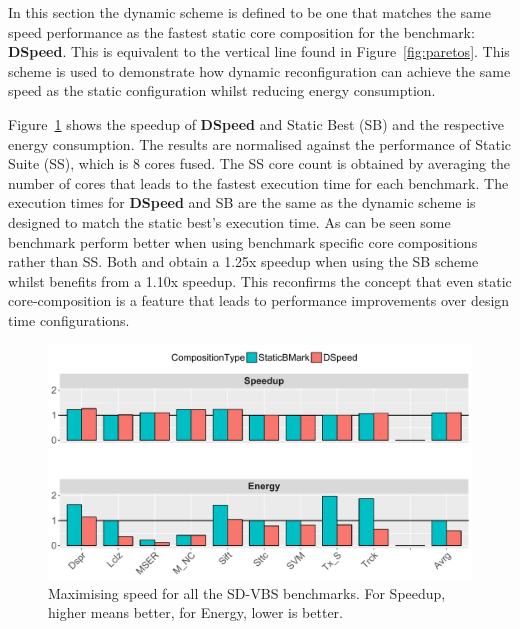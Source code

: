 In this section the dynamic scheme is defined to be one that matches the same speed performance as the fastest static core composition for the benchmark: \textbf{DSpeed}.
This is equivalent to the vertical line found in Figure~\ref{fig:paretos}.
This scheme is used to demonstrate how dynamic reconfiguration can achieve the same speed as the static configuration whilst reducing energy consumption.

Figure~\ref{fig:speedres} shows the speedup of \textbf{DSpeed} and Static Best (SB) and the respective energy consumption.
The results are normalised against the performance of Static Suite (SS), which is 8 cores fused.
The SS core count is obtained by averaging the number of cores that leads to the fastest execution time for each benchmark.
The execution times for \textbf{DSpeed} and SB are the same as the dynamic scheme is designed to match the static best's execution time.
As can be seen some benchmark perform better when using benchmark specific core compositions rather than SS.
Both  and  obtain a 1.25x speedup when using the SB scheme whilst  benefits from a 1.10x speedup.
This reconfirms the concept that even static core-composition is a feature that leads to performance improvements over design time configurations.

\begin{figure}[t]
    \centering
	\includegraphics[width=1\textwidth]{cases-paper/graphics/results/speed_bars3.pdf}
    \caption{Maximising speed for all the SD-VBS benchmarks. For Speedup, higher means better, for Energy, lower is better.}
    \label{fig:speedres}
	\vspace{1em}
\end{figure}

